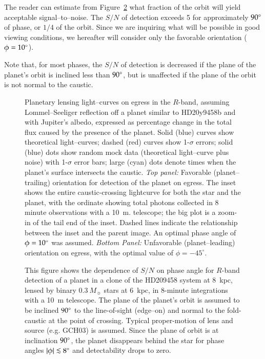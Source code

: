 The reader can estimate from Figure~\ref{micro_fig:snvsphase} what fraction
of the orbit will yield acceptable signal--to--noise.  The $S/N$ of
detection exceeds 5 for approximately $90\mbox{$^\circ$}$ of phase, or $1/4$ of
the orbit.  Since we are inquiring what will be possible in good
viewing conditions, we hereafter will consider only the favorable
orientation ($\phi=10\mbox{$^\circ$}$).

Note that, for most phases, the $S/N$ of detection is decreased if the
plane of the planet's orbit is inclined less than $90\mbox{$^\circ$}$, but is
unaffected if the plane of the orbit is not normal to the caustic.

\begin{figure}[p]
\caption[Planetary lensing egress light--curves.]{Planetary lensing
light--curves on egress in the $R$-band, assuming Lommel--Seeliger
reflection off a planet similar to HD20y9458b and with Jupiter's
albedo, expressed as percentage change in the total flux caused by the
presence of the planet.  Solid (blue) curves show theoretical
light--curves; dashed (red) curves show 1-$\sigma$ errors; solid
(blue) dots show random mock data (theoretical light--curve plus
noise) with 1-$\sigma$ error bars; large (cyan) dots denote times when
the planet's surface intersects the caustic. {\em Top panel:}
Favorable (planet--trailing) orientation for detection of the planet
on egress.  The inset shows the entire caustic-crossing lightcurve for
both the star and the planet, with the ordinate showing total photons
collected in 8 minute observations with a 10~m. telescope; the big
plot is a zoom-in of the tail end of the inset.  Dashed lines indicate
the relationship between the inset and the parent image.  An optimal
phase angle of $\phi=10\mbox{$^\circ$}$ was assumed. {\em Bottom Panel:}
Unfavorable (planet--leading) orientation on egress, with the optimal
value of $\phi=-45^\circ$.}
\label{micro_fig:tailhead} 
\end{figure}
\afterpage{\clearpage}

\begin{figure}[p]
\caption[S/N vs. phase angle.]{This figure shows the dependence of
$S/N$ on phase angle for $R$-band detection of a planet in a clone of
the HD209458 system at 8~kpc, lensed by binary $0.3~M_\sun$ stars at
6~kpc, in 8-minute integrations with a 10~m telescope.  The plane of
the planet's orbit is assumed to be inclined $90\mbox{$^\circ$}$ to the
line-of-sight (edge--on) and normal to the fold-caustic at the point
of crossing.  Typical proper-motion of lens and source (e.g. GCH03) is
assumed.  Since the plane of orbit is at inclination $90\mbox{$^\circ$}$, the
planet disappears behind the star for phase angles $|\phi|\lsim
8\degr$ and detectability drops to zero.}
\label{micro_fig:snvsphase}
\end{figure}
\afterpage{\clearpage}



